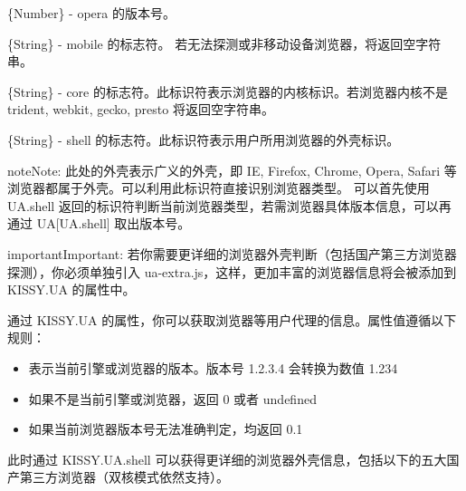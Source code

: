 \documentclass[letterpaper,10pt,english]{sphinxmanual}
\begin{document}

\begin{fulllineitems}
\label{api/core/ua/index:UA.opera}
\{Number\} - opera 的版本号。

\end{fulllineitems}



\begin{fulllineitems}
\label{api/core/ua/index:UA.mobile}
\{String\} - mobile 的标志符。 若无法探测或非移动设备浏览器，将返回空字符串。

\end{fulllineitems}



\begin{fulllineitems}
\label{api/core/ua/index:UA.core}
\{String\} - core 的标志符。此标识符表示浏览器的内核标识。若浏览器内核不是 trident, webkit, gecko, presto 将返回空字符串。

\end{fulllineitems}



\begin{fulllineitems}
\label{api/core/ua/index:UA.shell}
\{String\} - shell 的标志符。此标识符表示用户所用浏览器的外壳标识。

\end{fulllineitems}


\begin{notice}{note}{Note:}
此处的外壳表示广义的外壳，即 IE, Firefox, Chrome, Opera, Safari 等浏览器都属于外壳。可以利用此标识符直接识别浏览器类型。
可以首先使用 UA.shell 返回的标识符判断当前浏览器类型，若需浏览器具体版本信息，可以再通过 UA{[}UA.shell{]} 取出版本号。
\end{notice}

\begin{notice}{important}{Important:}
若你需要更详细的浏览器外壳判断（包括国产第三方浏览器探测），你必须单独引入 ua-extra.js，这样，更加丰富的浏览器信息将会被添加到 KISSY.UA 的属性中。

通过 KISSY.UA 的属性，你可以获取浏览器等用户代理的信息。属性值遵循以下规则：
\begin{itemize}
\item {}
表示当前引擎或浏览器的版本。版本号 1.2.3.4 会转换为数值 1.234

\item {}
如果不是当前引擎或浏览器，返回 0 或者 undefined

\item {}
如果当前浏览器版本号无法准确判定，均返回 0.1

\end{itemize}

此时通过 KISSY.UA.shell 可以获得更详细的浏览器外壳信息，包括以下的五大国产第三方浏览器（双核模式依然支持）。
\end{notice}
\end{document}
